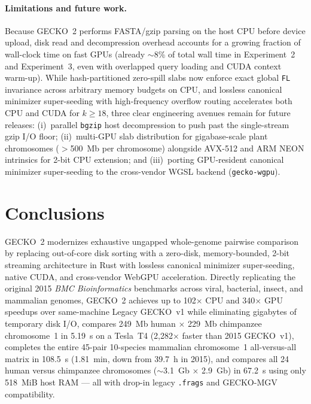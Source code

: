 \documentclass[pdflatex,sn-vancouver,Numbered]{sn-jnl}
\newcommand{\hlDrosSpeedupCpuVsVone}{102$\times$}
\newcommand{\hlDrosSpeedupCudaVsVone}{340$\times$}
\newcommand{\hlChrOneSpeedupCudaVsPub}{2,282$\times$}
\newcommand{\hlAllVsAllCudaMin}{1.81~min}
\newcommand{\hlAllVsAllCudaSec}{108.5~s}
\newcommand{\hlWholeGenomeCudaSec}{67.2~s}
\newcommand{\eOneChrOneCuda}{5.19}
\begin{document}
\paragraph{Limitations and future work.}
Because GECKO~2 performs FASTA/gzip parsing on the host CPU before device upload, disk read and decompression overhead accounts for a growing fraction of wall-clock time on fast GPUs (already $\sim$8\% of total wall time in Experiment~2 and Experiment~3, even with overlapped query loading and CUDA context warm-up). While hash-partitioned zero-spill slabs now enforce exact global \texttt{FL} invariance across arbitrary memory budgets on CPU, and lossless canonical minimizer super-seeding with high-frequency overflow routing accelerates both CPU and CUDA for $k \ge 18$, three clear engineering avenues remain for future releases: (i)~parallel \texttt{bgzip} host decompression to push past the single-stream gzip I/O floor; (ii)~multi-GPU slab distribution for gigabase-scale plant chromosomes ($>$500~Mb per chromosome) alongside AVX-512 and ARM NEON intrinsics for 2-bit CPU extension; and (iii)~porting GPU-resident canonical minimizer super-seeding to the cross-vendor WGSL backend (\texttt{gecko-wgpu}).

\section{Conclusions}\label{sec:conclusions}

GECKO~2 modernizes exhaustive ungapped whole-genome pairwise comparison by replacing out-of-core disk sorting with a zero-disk, memory-bounded, 2-bit streaming architecture in Rust with lossless canonical minimizer super-seeding, native CUDA, and cross-vendor WebGPU acceleration. Directly replicating the original 2015 \textit{BMC Bioinformatics} benchmarks across viral, bacterial, insect, and mammalian genomes, GECKO~2 achieves up to \hlDrosSpeedupCpuVsVone{} CPU and \hlDrosSpeedupCudaVsVone{} GPU speedups over same-machine Legacy GECKO~v1 while eliminating gigabytes of temporary disk I/O, compares 249~Mb human $\times$ 229~Mb chimpanzee chromosome~1 in \eOneChrOneCuda{}~s on a Tesla~T4 (\hlChrOneSpeedupCudaVsPub{} faster than 2015 GECKO~v1), completes the entire 45-pair 10-species mammalian chromosome~1 all-versus-all matrix in \hlAllVsAllCudaSec{} (\hlAllVsAllCudaMin{}, down from 39.7~h in 2015), and compares all 24 human versus chimpanzee chromosomes ($\sim$3.1~Gb $\times$ 2.9~Gb) in \hlWholeGenomeCudaSec{} using only 518~MiB host RAM --- all with drop-in legacy \texttt{.frags} and GECKO-MGV compatibility.
\end{document}
